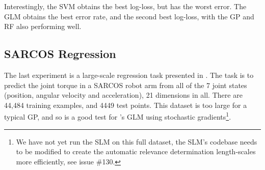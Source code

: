 \documentclass[11pt, oneside]{article}
\begin{document}
Interestingly, the SVM obtains the best log-loss, but has the worst error. The
GLM obtains the best error rate, and the second best log-loss, with the GP and
RF also performing well.


\subsection{SARCOS Regression}

The last experiment is a large-scale regression task presented in
\citet[Chapter 8]{Rasmussen2006}. The task is to predict the joint torque in a
SARCOS robot arm from all of the 7 joint states (position, angular velocity and
acceleration), 21 dimensions in all. There are 44,484 training examples, and
4449 test points. This dataset is too large for a typical GP, and so is a good
test for \revrand{}'s GLM using stochastic gradients\footnote{We have not yet
    run the SLM on this full dataset, the SLM's codebase needs to be modified
    to create the automatic relevance determination length-scales more
    efficiently, see issue \#130.}.
\end{document}
